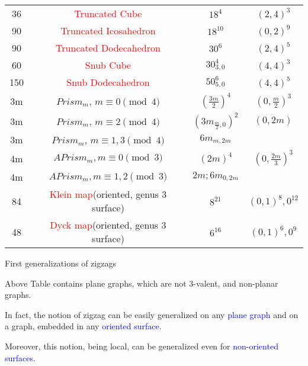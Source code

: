 \documentclass[%
pdf,
colorBG,
slideColor,
]{prosper}
\begin{document}
\begin{slide}{}

\begin{center}
{\scriptsize
\begin{tabular}{||c|c|c|c||}
\hline
\hline
36 &\textcolor{red}{Truncated Cube}&$18^4$&$(2,4)^3$\\
90 &\textcolor{red}{Truncated Icosahedron}&$18^{10}$&$(0,2)^9$\\ 
90 &\textcolor{red}{Truncated Dodecahedron}&$30^6$&$(2,4)^5$\\ 
60 &\textcolor{red}{Snub Cube}&$30_{3,0}^4$&$(4,4)^3$\\ 
150&\textcolor{red}{Snub Dodecahedron}&$50_{5,0}^6$&$(4,4)^5$\\ \hline
3m &$Prism_m$, $m\equiv 0 \pmod{4}$&$(\frac{3m}{2})^4$&$(0,\frac{m}{2})^3$\\
3m &$Prism_m$, $m\equiv 2 \pmod{4}$&$({3m}_{\frac{m}{2},0})^2$&$(0,2m)$\\ 
3m &$Prism_m$, $m\equiv 1,3 \pmod{4}$&${6m}_{m,2m}$&\\ 
4m &$APrism_m, m \equiv 0 \pmod{3}$&$(2m)^4$&$(0,\frac{2m}{3})^3$\\ 
4m &$APrism_m, m \equiv 1,2 \pmod{3}$&$2m;6m_{0,2m}$&\\ \hline\hline
84 &\textcolor{red}{Klein map}(oriented, genus $3$ surface)&$8^{21}$&$(0,1)^8, {0}^{12}$\\
48 &\textcolor{red}{Dyck map}(oriented, genus $3$ surface)&$6^{16}$&$(0,1)^6, {0}^9$\\
\hline
\hline
\end{tabular}
}
\end{center}


\end{slide}







\begin{slide}{First generalizations of zigzags}
\vspace{3mm}

Above Table contains plane graphs, which are not $3$-valent, and non-planar graphs.

\vspace{6mm}

In fact, the notion of zigzag can be easily generalized on any \textcolor{blue}{plane graph} and on a graph, embedded in any \textcolor{blue}{oriented surface}.

\vspace{6mm}

Moreover, this notion, being local, can be generalized even for \textcolor{blue}{non-oriented surfaces}.


\end{slide}
\end{document}
